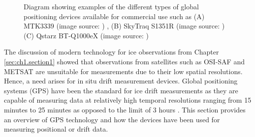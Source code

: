 \begin{figure}[H]
	\centering
	\begin{subfigure}[t]{.3\textwidth}
	\end{subfigure}
	\hfill
	\begin{subfigure}[t]{.3\textwidth}
	\end{subfigure}
	\hfill
	\begin{subfigure}[t]{.3\textwidth}
	\end{subfigure}
	\hfill
	\label{fig:device_gps}
	\caption{Diagram showing examples of the different types of global positioning devices available for commercial use such as (A) MTK3339 (image source: \cite{mtk3339}) , (B) SkyTraq S1351R (image source: \cite{s1315F}) (C) Qstarz BT-Q1000eX (image source: \cite{BTQ1000EX})  }
\end{figure}
The discussion of modern technology for ice observations from Chapter \ref{sec:ch1.section1} showed that observations from satellites such as OSI-SAF and METSAT are unsuitable for measurements \cite{lepparanta2001sea,galin2011validation} due to their low spatial resolutions. Hence, a need arises for in situ drift measurement devices. Global positioning systems (GPS) have been the standard for ice drift measurements \cite{lepparanta2001sea} as they are capable of measuring data at relatively high temporal resolutions ranging from 15 minutes \cite{alberello2019drift} to 25 minutes \cite{rabault2019open} as opposed to the limit of 3 hours \cite{alberello2019drift}. This section provides an overview of GPS technology and how the devices have been used for measuring positional or drift data.

